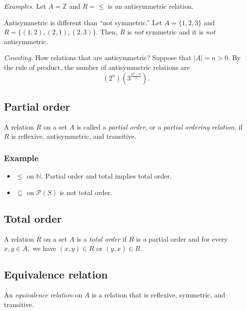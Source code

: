 \documentclass[11pt]{article}
\begin{document}
    \vspace{1em}

    \emph{Examples.} Let \(A = \mathbb{Z}\) and \(R = \leq\) is an antisymmetric relation.

    \vspace{1em}

    Antisymmetric is different than ``not symmetric.'' Let \(A = \{1,2,3\}\) and \(R = \{(1,2), (2,1), (2,3)\}\). Then, $R$ is \emph{not} symmetric and it is \emph{not} antisymmetric.

    \vspace{1em}

    \emph{Counting.} How relations that are antisymmetric? Suppose that \(|A| = n > 0\). By the rule of product, the number of antisymmetric relations are \[(2^n)(3^{\frac{n^2-n}{2}}).\]

    \subsection{Partial order}

    A relation $R$ on a set $A$ is called a \emph{partial order}, or a \emph{partial ordering relation}, if $R$ is reflexive, antisymmetric, and transitive.

    \subsubsection{Example}

    \begin{itemize}
        \item \(\leq\) on \(\mathbb{N}\). Partial order and total implies total order.
        \item \(\subseteq\) on \(\mathcal{P}(S)\) is not total order.
    \end{itemize}

    \subsection{Total order}

    A relation $R$ on a set $A$ is a \emph{total order} if $R$ is a partial order and for every \(x,y \in A,\) we have \((x,y) \in R\) or \((y,x) \in R\).

    \subsection{Equivalence relation}

    An \emph{equivalence relation} on $A$ is a relation that is reflexive, symmetric, and transitive.
\end{document}
